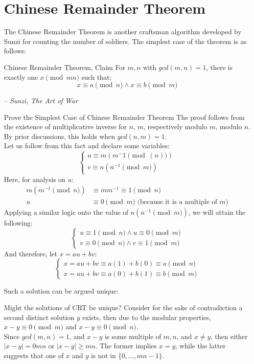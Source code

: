 \section{Chinese Remainder Theorem}
The Chinese Remainder Theorem is another craftsman algorithm developed by Sunzi for counting the number of soldiers. The simplest case of the theorem is as follows:
\begin{ln-define}{Chinese Remainder Theorem, Claim}{}
    For $m,n$ with $gcd(m, n) = 1$, there is exactly one $x\pmod{mn}$ such that:
    \[x \equiv a\pmod{n} \land x \equiv b\pmod{m}\]
    \begin{flushright}
        \textit{-- Sunzi, The Art of War}
    \end{flushright}
\end{ln-define}
\begin{ln-quest}{Prove the Simplest Case of Chinese Remainder Theorem}{}
    The proof follows from the existence of multiplicative inverse for $n$, $m$, respectively modulo $m$, modulo $n$. By prior discussions, this holds when $gcd(n, m) = 1$. \\
    Let us follow from this fact and declare some variables:
    \[
        \begin{cases}
            u \equiv m(m^-1\pmod(n)) \\
            v \equiv n(n^{-1}\pmod{m})
        \end{cases}
    \]
    Here, for analysis on $u$: 
    \begin{align*}
        m(m^{-1}\pmod{n}) &\equiv mm^{-1} \equiv 1\pmod{n} \\
        u &\equiv 0\pmod{m} \text{ (because it is a multiple of $m$)}
    \end{align*}
    Applying a similar logic onto the value of $n(n^{-1}\pmod{m})$, we will attain the following:
    \[
        \begin{cases}
            u \equiv 1\pmod{n} \land u \equiv 0\pmod{m} \\
            v \equiv 0\pmod{n} \land v \equiv 1\pmod{m}
        \end{cases}
    \]
    And therefore, let $x = au + bv$:
    \[
        \begin{cases}
            x = au + bv \equiv a(1) + b(0) \equiv a\pmod{n} \\
            x = au + bv \equiv a(0) + b(1) \equiv b\pmod{m}
        \end{cases}
    \]
\end{ln-quest}
Such a solution can be argued unique:
\begin{ln-think}{Might the solutions of CRT be unique?}{}
    Consider for the sake of contradiction a second distinct solution $y$ exists, then due to the modular properties, $x - y \equiv 0\pmod{m}$ and $x - y \equiv 0\pmod{n}$. \\
    Since $gcd(m, n) = 1$, and $x - y$ is some multiple of $m, n$, and $x \neq y$, then either $|x - y| = 0mn$ or $|x - y| \geq mn$. The former implies $x = y$, while the latter suggests that one of $x$ and $y$ is not in $\{0, \dots, mn - 1\}$. \\
\end{ln-think}
